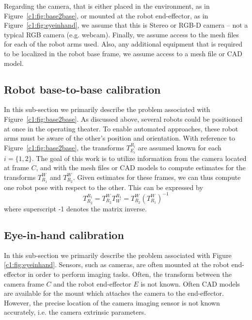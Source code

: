 Regarding the camera, that is either placed in the environment, as in Figure~\ref{c1:fig:base2base}, or mounted at the robot end-effector, as in Figure~\ref{c1:fig:eyeinhand}, we assume that this is Stereo or RGB-D camera -- not a typical RGB camera (e.g. webcam).
Finally, we assume access to the mesh files for each of the robot arms used.
Also, any additional equipment that is required to be localized in the robot base frame, we assume access to a mesh file or CAD model.

\subsection{Robot base-to-base calibration}

In this sub-section we primarily describe the problem associated with Figure~\ref{c1:fig:base2base}.
As discussed above, several robots could be positioned at once in the operating theater.
To enable automated approaches, these robot arms must be aware of the other's position and orientation.
With reference to Figure~\ref{c1:fig:base2base}, the transforms $T^{R_i}_{E_i}$ are assumed known for each $i=\{1, 2\}$.
The goal of this work is to utilize information from the camera located at frame $C$, and with the mesh files or CAD models to compute estimates for the transforms $T^W_{R_1}$ and $T^W_{R_2}$.
Given estimates for these frames, we can thus compute one robot pose with respect to the other.
This can be expressed by
\[
T^{R_1}_{R_2} = T^W_{R_2} T^{R_1}_W = T^W_{R_2} (T^W_{R_1})^{-1}
\]
where superscript -1 denotes the matrix inverse. 

\subsection{Eye-in-hand calibration}

In this sub-section we primarily describe the problem associated with Figure \ref{c1:fig:eyeinhand}.
Sensors, such as cameras, are often mounted at the robot end-effector in order to perform imaging tasks.
Often, the transform between the camera frame $C$ and the robot end-effector $E$ is not known.
Often CAD models are available for the mount which attaches the camera to the end-effector.
However, the precise location of the camera imaging sensor is not known accurately, i.e. the camera extrinsic parameters.

